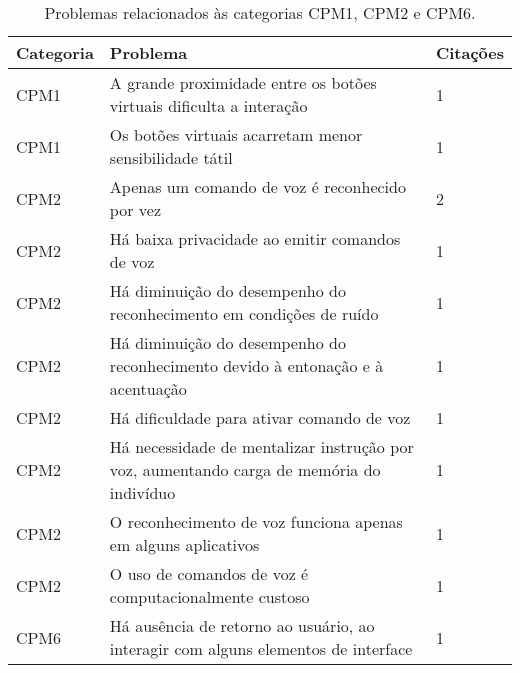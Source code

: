 \begin{table}[htb]
  \begin{center}
    \ABNTEXfontereduzida
    \caption{Problemas relacionados às categorias CPM1, CPM2 e CPM6.}
    \label{tab-pro-1-2-6}
    \begin{tabular}{p{1.4cm}|p{11.7cm}|p{1.4cm}}
      \textbf{Categoria} & \textbf{Problema}                                                                               & \textbf{Citações} \\
      \hline
      CPM1               & A grande proximidade entre os botões virtuais dificulta a interação                             & 1                 \\
      \hline
      CPM1               & Os botões virtuais acarretam menor sensibilidade tátil                                          & 1                 \\
      \hline
      CPM2               & Apenas um comando de voz é reconhecido por vez                                                  & 2                 \\
      \hline
      CPM2               & Há baixa privacidade ao emitir comandos de voz                                                  & 1                 \\
      \hline
      CPM2               & Há diminuição do desempenho do reconhecimento em condições de ruído                             & 1                 \\
      \hline
      CPM2               & Há diminuição do desempenho do reconhecimento devido à entonação e à acentuação                 & 1                 \\
      \hline
      CPM2               & Há dificuldade para ativar comando de voz                                                       & 1                 \\
      \hline
      CPM2               & Há necessidade de mentalizar instrução por voz, aumentando carga de memória do indivíduo        & 1                 \\
      \hline
      CPM2               & O reconhecimento de voz funciona apenas em alguns aplicativos                                   & 1                 \\
      \hline
      CPM2               & O uso de comandos de voz é computacionalmente custoso                                           & 1                 \\
      \hline
      CPM6               & Há ausência de retorno ao usuário, ao interagir com alguns elementos de interface               & 1                 \\

\end{tabular}
\end{center}
\end{table}
